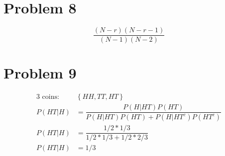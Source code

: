 \documentclass{article}
\begin{document}
\begin{flushleft}
\section*{Problem 8}
\[ \dfrac{(N-r)(N-r-1)}{(N-1)(N-2)}
\]
\section*{Problem 9}
\begin{align*}
\text{3 coins: } &\left\{HH,TT,HT\right\}\\
P(HT|H)&=\dfrac{P(H|HT)P(HT)}{P(H|HT)P(HT)+P(H|{HT}^c)P({HT}^c)}\\
P(HT|H)&=\dfrac{1/2*1/3}{1/2*1/3+1/2*2/3}\\
P(HT|H)&=1/3
\end{align*}
\end{flushleft}
\end{document}
